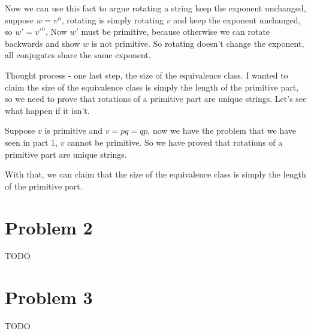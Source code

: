 \documentclass{article}
\begin{document}
Now we can use this fact to argue rotating a string keep the exponent unchanged, suppose $ w = v^n $, rotating is simply rotating $ v $ and keep the exponent unchanged, so $ w' = v'^n $, Now $ w' $ must be primitive, because otherwise we can rotate backwards and show $ w $ is not primitive. So rotating doesn't change the exponent, all conjugates share the same exponent.

Thought process - one last step, the size of the equivalence class. I wanted to claim the size of the equivalence class is simply the length of the primitive part, so we need to prove that rotations of a primitive part are unique strings. Let's see what happen if it isn't.

Suppose $ v $ is primitive and $ v = pq = qp $, now we have the problem that we have seen in part 1, $ v $ cannot be primitive. So we have proved that rotations of a primitive part are unique strings.

With that, we can claim that the size of the equivalence class is simply the length of the primitive part.



\section*{Problem 2}
TODO

\section*{Problem 3}
TODO
\end{document}
